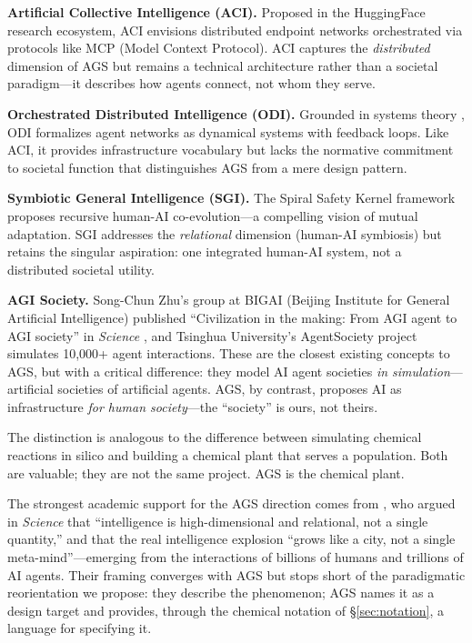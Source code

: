 \documentclass[12pt]{article}
\begin{document}
\textbf{Artificial Collective Intelligence (ACI).} Proposed in the HuggingFace research ecosystem, ACI envisions distributed endpoint networks orchestrated via protocols like MCP (Model Context Protocol). ACI captures the \emph{distributed} dimension of AGS but remains a technical architecture rather than a societal paradigm---it describes how agents connect, not whom they serve.

\textbf{Orchestrated Distributed Intelligence (ODI).} Grounded in systems theory \citep{li2025}, ODI formalizes agent networks as dynamical systems with feedback loops. Like ACI, it provides infrastructure vocabulary but lacks the normative commitment to societal function that distinguishes AGS from a mere design pattern.

\textbf{Symbiotic General Intelligence (SGI).} The Spiral Safety Kernel framework proposes recursive human-AI co-evolution---a compelling vision of mutual adaptation. SGI addresses the \emph{relational} dimension (human-AI symbiosis) but retains the singular aspiration: one integrated human-AI system, not a distributed societal utility.

\textbf{AGI Society.} Song-Chun Zhu's group at BIGAI (Beijing Institute for General Artificial Intelligence) published ``Civilization in the making: From AGI agent to AGI society'' in \emph{Science} \citep{zhu2025}, and Tsinghua University's AgentSociety project simulates 10,000+ agent interactions. These are the closest existing concepts to AGS, but with a critical difference: they model AI agent societies \emph{in simulation}---artificial societies of artificial agents. AGS, by contrast, proposes AI as infrastructure \emph{for human society}---the ``society'' is ours, not theirs.

The distinction is analogous to the difference between simulating chemical reactions in silico and building a chemical plant that serves a population. Both are valuable; they are not the same project. AGS is the chemical plant.

The strongest academic support for the AGS direction comes from \citet{evans2025}, who argued in \emph{Science} that ``intelligence is high-dimensional and relational, not a single quantity,'' and that the real intelligence explosion ``grows like a city, not a single meta-mind''---emerging from the interactions of billions of humans and trillions of AI agents. Their framing converges with AGS but stops short of the paradigmatic reorientation we propose: they describe the phenomenon; AGS names it as a design target and provides, through the chemical notation of \S\ref{sec:notation}, a language for specifying it.
\end{document}
